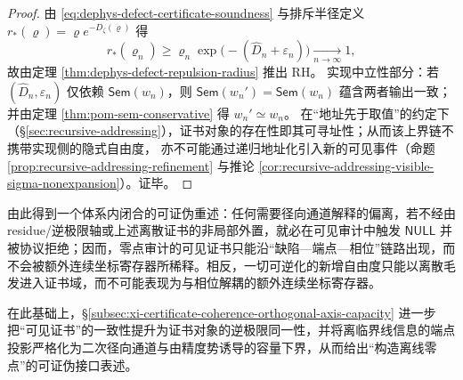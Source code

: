 \begin{proof}
由 \eqref{eq:dephys-defect-certificate-soundness} 与排斥半径定义 \(r_{\ast}(\varrho)=\varrho e^{-D_{\zeta}(\varrho)}\) 得
\[
r_{\ast}(\varrho_n)\ge \varrho_n\exp\!\bigl(-(\widehat D_n+\varepsilon_n)\bigr)\xrightarrow[n\to\infty]{}1,
\]
故由定理 \ref{thm:dephys-defect-repulsion-radius} 推出 RH。
实现中立性部分：若 \((\widehat D_n,\varepsilon_n)\) 仅依赖 \(\mathsf{Sem}(w_n)\)，则 \(\mathsf{Sem}(w_n')=\mathsf{Sem}(w_n)\) 蕴含两者输出一致；并由定理 \ref{thm:pom-sem-conservative} 得 \(w_n'\simeq w_n\)。
在“地址先于取值”的约定下（\S\ref{sec:recursive-addressing}），证书对象的存在性即其可寻址性；从而该上界链不携带实现侧的隐式自由度，
亦不可能通过递归地址化引入新的可见事件（命题 \ref{prop:recursive-addressing-refinement} 与推论 \ref{cor:recursive-addressing-visible-sigma-nonexpansion}）。证毕。
\end{proof}

由此得到一个体系内闭合的可证伪重述：任何需要径向通道解释的偏离，若不经由 residue/逆极限轴或上述离散证书的非局部外置，就必在可见审计中触发 \(\mathsf{NULL}\) 并被协议拒绝；因而，零点审计的可见证书只能沿“缺陷—端点—相位”链路出现，而不会被额外连续坐标寄存器所稀释。相反，一切可逆化的新增自由度只能以离散毛发进入证书域，而不可能表现为与相位解耦的额外连续坐标寄存器。

在此基础上，\S\ref{subsec:xi-certificate-coherence-orthogonal-axis-capacity} 进一步把“可见证书”的一致性提升为证书对象的逆极限同一性，并将离临界线信息的端点投影严格化为二次径向通道与由精度势诱导的容量下界，从而给出“构造离线零点”的可证伪接口表述。
\endinput
